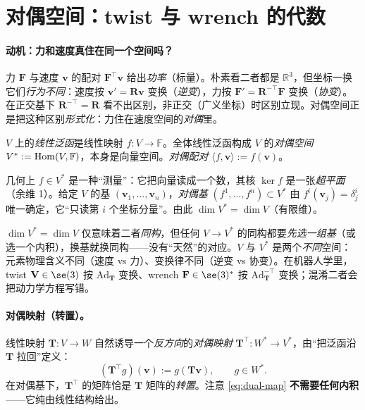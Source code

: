 \section{对偶空间：twist 与 wrench 的代数}
\label{sec:dual}

\paragraph{动机：力和速度真住在同一个空间吗？}
力 $\mathbf{F}$ 与速度 $\mathbf{v}$ 的配对 $\mathbf{F}^\top\mathbf{v}$ 给出\emph{功率}（标量）。朴素看二者都是 $\mathbb{R}^3$，但坐标一换它们\emph{行为不同}：速度按 $\mathbf{v}'=\mathbf{R}\mathbf{v}$ 变换（\emph{逆变}），力按 $\mathbf{F}'=\mathbf{R}^{-\top}\mathbf{F}$ 变换（\emph{协变}）。在正交基下 $\mathbf{R}^{-\top}=\mathbf{R}$ 看不出区别，非正交（广义坐标）时区别立现。对偶空间正是把这种区别\emph{形式化}：力住在速度空间的\emph{对偶}里。

\begin{definition}[对偶空间与对偶配对]\label{def:dual}
$V$ 上的\emph{线性泛函}是线性映射 $f:V\to\mathbb{F}$。全体线性泛函构成 $V$ 的\emph{对偶空间} $V^*:=\operatorname{Hom}(V,\mathbb{F})$，本身是向量空间。\emph{对偶配对} $\langle f,\mathbf{v}\rangle:=f(\mathbf{v})$。
\end{definition}

\noindent 几何上 $f\in V^*$ 是一种“测量”：它把向量读成一个数，其核 $\ker f$ 是一张\emph{超平面}（余维 1）。给定 $V$ 的基 $(\mathbf{v}_1,\dots,\mathbf{v}_n)$，\emph{对偶基} $(f^1,\dots,f^n)\subset V^*$ 由 $f^i(\mathbf{v}_j)=\delta^i_j$ 唯一确定，它“只读第 $i$ 个坐标分量”。由此 $\dim V^*=\dim V$（有限维）。

\begin{pitfall}
$\dim V^*=\dim V$ 仅意味着二者\emph{同构}，但任何 $V\to V^*$ 的同构都要\emph{先选一组基}（或选一个内积），换基就换同构——没有“天然”的对应。$V$ 与 $V^*$ 是两个\emph{不同}空间：元素物理含义不同（速度 vs 力）、变换律不同（逆变 vs 协变）。在机器人学里，twist $\mathbf{V}\in\se(3)$ 按 $\mathrm{Ad}_{\mathbf{T}}$ 变换、wrench $\mathbf{F}\in\se(3)^*$ 按 $\mathrm{Ad}_{\mathbf{T}}^{-\top}$ 变换；混淆二者会把动力学方程写错。
\end{pitfall}

\paragraph{对偶映射（转置）。}
线性映射 $\mathbf{T}:V\to W$ 自然诱导一个\emph{反方向}的\emph{对偶映射} $\mathbf{T}^\top:W^*\to V^*$，由“把泛函沿 $\mathbf{T}$ 拉回”定义：
\begin{equation}
  (\mathbf{T}^\top g)(\mathbf{v}):=g(\mathbf{T}\mathbf{v}),\qquad g\in W^*.
  \label{eq:dual-map}
\end{equation}
在对偶基下，$\mathbf{T}^\top$ 的矩阵恰是 $\mathbf{T}$ 矩阵的\emph{转置}。注意 \cref{eq:dual-map} \textbf{不需要任何内积}——它纯由线性结构给出。

